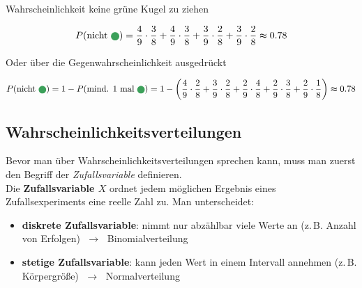 \begin{bsp}
Wahrscheinlichkeit keine grüne Kugel zu ziehen

\[
    P(\text{nicht }\fatdot[mygreen][3pt]) = 
    \frac{4}{9} \cdot \frac{3}{8} + 
    \frac{4}{9} \cdot \frac{3}{8} + 
    \frac{3}{9} \cdot \frac{2}{8} + 
    \frac{3}{9} \cdot \frac{2}{8}  
    \thickapprox 0.78
\]

Oder über die Gegenwahrscheinlichkeit ausgedrückt

\[
    P(\text{nicht }\fatdot[mygreen][3pt]) = 
        1 - P(\text{mind. 1 mal }\fatdot[mygreen][3pt]) = 
        1 - \left( 
            \frac{4}{9}\cdot\frac{2}{8} + 
            \frac{3}{9}\cdot\frac{2}{8} + 
            \frac{2}{9}\cdot\frac{4}{8} + 
            \frac{2}{9}\cdot\frac{3}{8} + 
            \frac{2}{9}\cdot\frac{1}{8} 
        \right) 
        \thickapprox 0.78
\]


\end{bsp}

\subsection{Wahrscheinlichkeitsverteilungen}
Bevor man über Wahrscheinlichkeitsverteilungen sprechen kann, muss man zuerst den Begriff der \emph{Zufallsvariable} definieren. \\
Die \textbf{Zufallsvariable $X$} ordnet jedem möglichen Ergebnis eines Zufallsexperiments eine reelle Zahl zu. Man unterscheidet:
\begin{itemize}
    \item \textbf{diskrete Zufallsvariable}: nimmt nur abzählbar viele Werte an (z.\,B. Anzahl von Erfolgen) $\;\to\;$ Binomialverteilung
    \item \textbf{stetige Zufallsvariable}: kann jeden Wert in einem Intervall annehmen (z.\,B. Körpergröße) $\;\to\;$ Normalverteilung
\end{itemize}
